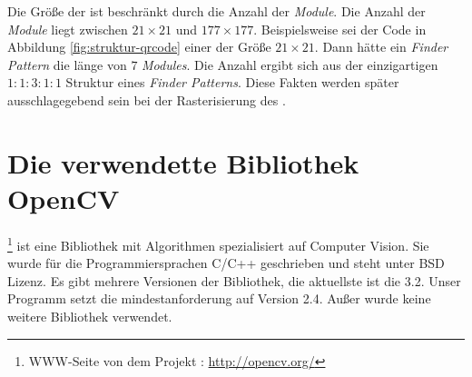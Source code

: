 Die Größe der \QRCodes ist beschränkt durch die Anzahl der \emph{Module}. Die Anzahl der \emph{Module} liegt zwischen $21 \times 21$ und $177 \times 177$. Beispielsweise sei der Code in Abbildung \ref{fig:struktur-qrcode} einer der Größe $21 \times 21$. Dann hätte ein \emph{Finder Pattern} die länge von $7$ \emph{Modules}. Die Anzahl ergibt sich aus der einzigartigen $1:1:3:1:1$ Struktur eines \emph{Finder Patterns}. Diese Fakten werden später ausschlagegebend sein bei der Rasterisierung des \QRCodes.

\section{Die verwendette Bibliothek OpenCV}
\OpenCV\footnote{WWW-Seite von dem Projekt \OpenCV: \url{http://opencv.org/}} ist eine Bibliothek mit Algorithmen spezialisiert auf \glqq Computer Vision\grqq . Sie wurde für die Programmiersprachen C/C++ geschrieben und steht unter BSD Lizenz. Es gibt mehrere Versionen der Bibliothek, die aktuellste ist die 3.2. Unser Programm setzt  die mindestanforderung auf Version 2.4. Außer \OpenCV wurde keine weitere Bibliothek verwendet. 



